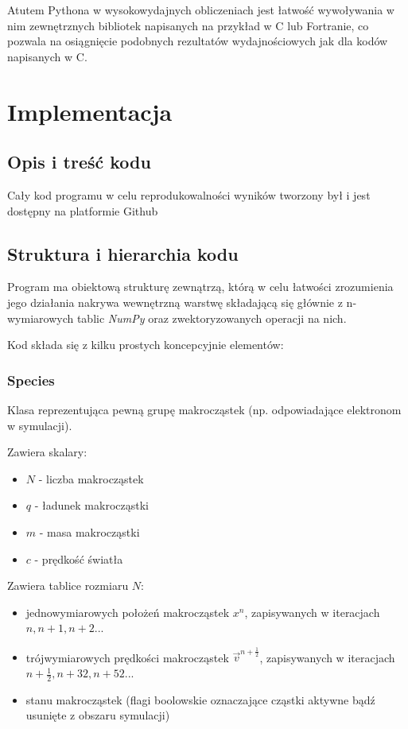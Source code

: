 Atutem Pythona w wysokowydajnych obliczeniach jest łatwość wywoływania w nim zewnętrznych bibliotek napisanych
na przykład w C lub Fortranie, co pozwala na osiągnięcie podobnych rezultatów wydajnościowych jak dla kodów
napisanych w C.


\section[Implementacja]{Implementacja}%
\subsection{Opis i treść kodu}
Cały kod programu w celu reprodukowalności wyników tworzony był i jest dostępny na platformie Github %

\subsection{Struktura i hierarchia kodu}

Program ma obiektową strukturę zewnątrzą, którą w celu łatwości zrozumienia jego działania nakrywa wewnętrzną warstwę
składającą się głównie z n-wymiarowych tablic \emph{NumPy} oraz zwektoryzowanych operacji na nich.

Kod składa się z kilku prostych koncepcyjnie elementów:

\subsubsection{Species}
Klasa reprezentująca pewną grupę makrocząstek (np. odpowiadające elektronom w symulacji).

Zawiera skalary:
\begin{itemize}
\item $N$ - liczba makrocząstek
\item $q$ - ładunek makrocząstki
\item $m$ - masa makrocząstki
\item $c$ - prędkość światła
\end{itemize}

Zawiera tablice rozmiaru $N$:
\begin{itemize}
\item jednowymiarowych położeń makrocząstek $x^n$, zapisywanych w iteracjach $n, n+1, n+2$...
\item trójwymiarowych prędkości makrocząstek $\vec{v}^{n+\frac{1}{2}}$, zapisywanych w iteracjach $n+\frac{1}{2}, n+{3}{2}, n+{5}{2}$...
\item stanu makrocząstek (flagi boolowskie oznaczające cząstki aktywne bądź usunięte z obszaru symulacji)
\end{itemize}

